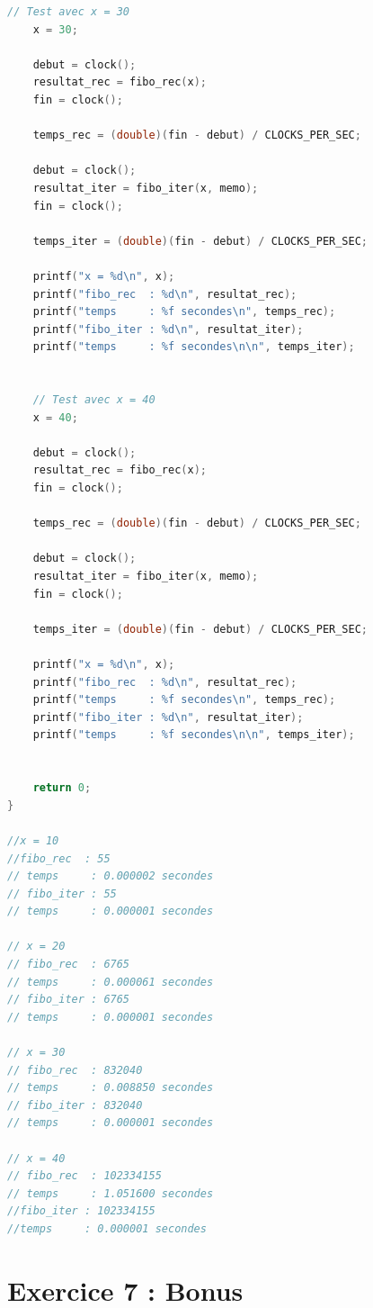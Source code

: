 \documentclass{article}
\begin{document}
\begin{lstlisting}[language=C, caption={Fibonacci}]
    // Test avec x = 30
    x = 30;

    debut = clock();
    resultat_rec = fibo_rec(x);
    fin = clock();

    temps_rec = (double)(fin - debut) / CLOCKS_PER_SEC;

    debut = clock();
    resultat_iter = fibo_iter(x, memo);
    fin = clock();

    temps_iter = (double)(fin - debut) / CLOCKS_PER_SEC;

    printf("x = %d\n", x);
    printf("fibo_rec  : %d\n", resultat_rec);
    printf("temps     : %f secondes\n", temps_rec);
    printf("fibo_iter : %d\n", resultat_iter);
    printf("temps     : %f secondes\n\n", temps_iter);


    // Test avec x = 40
    x = 40;

    debut = clock();
    resultat_rec = fibo_rec(x);
    fin = clock();

    temps_rec = (double)(fin - debut) / CLOCKS_PER_SEC;

    debut = clock();
    resultat_iter = fibo_iter(x, memo);
    fin = clock();

    temps_iter = (double)(fin - debut) / CLOCKS_PER_SEC;

    printf("x = %d\n", x);
    printf("fibo_rec  : %d\n", resultat_rec);
    printf("temps     : %f secondes\n", temps_rec);
    printf("fibo_iter : %d\n", resultat_iter);
    printf("temps     : %f secondes\n\n", temps_iter);


    return 0;
}

//x = 10
//fibo_rec  : 55
// temps     : 0.000002 secondes
// fibo_iter : 55
// temps     : 0.000001 secondes

// x = 20
// fibo_rec  : 6765
// temps     : 0.000061 secondes
// fibo_iter : 6765
// temps     : 0.000001 secondes

// x = 30
// fibo_rec  : 832040
// temps     : 0.008850 secondes
// fibo_iter : 832040
// temps     : 0.000001 secondes

// x = 40
// fibo_rec  : 102334155
// temps     : 1.051600 secondes
//fibo_iter : 102334155
//temps     : 0.000001 secondes
\end{lstlisting}

\section*{\textbf{Exercice 7 : Bonus}}
\end{document}
